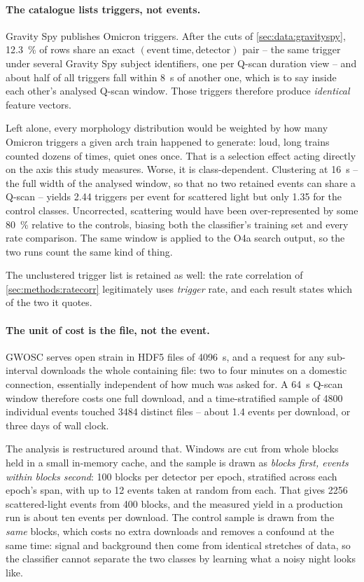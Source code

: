 \paragraph{The catalogue lists triggers, not events.} Gravity Spy publishes
Omicron triggers. After the cuts of \cref{sec:data:gravityspy},
\SI{12.3}{\percent} of rows share an exact $(\mathrm{event\ time},
\mathrm{detector})$ pair -- the same trigger under several Gravity Spy subject
identifiers, one per Q-scan duration view -- and about half of all triggers
fall within \SI{8}{\second} of another one, which is to say inside each other's
analysed Q-scan window. Those triggers therefore produce \emph{identical}
feature vectors.

Left alone, every morphology distribution would be weighted by how many
Omicron triggers a given arch train happened to generate: loud, long trains
counted dozens of times, quiet ones once. That is a selection effect acting
directly on the axis this study measures. Worse, it is class-dependent.
Clustering at \SI{16}{\second} -- the full width of the analysed window, so
that no two retained events can share a Q-scan -- yields \num{2.44} triggers
per event for scattered light but only \num{1.35} for the control classes.
Uncorrected, scattering would have been over-represented by some
\SI{80}{\percent} relative to the controls, biasing both the classifier's
training set and every rate comparison. The same window is applied to the O4a
search output, so the two runs count the same kind of thing.

The unclustered trigger list is retained as well: the rate correlation of
\cref{sec:methods:ratecorr} legitimately uses \emph{trigger} rate, and each
result states which of the two it quotes.

\paragraph{The unit of cost is the file, not the event.} GWOSC serves open
strain in HDF5 files of \SI{4096}{\second}, and a request for any
sub-interval downloads the whole containing file: two to four minutes on a
domestic connection, essentially independent of how much was asked for. A
\SI{64}{\second} Q-scan window therefore costs one full download, and a
time-stratified sample of \num{4800} individual events touched \num{3484}
distinct files -- about \num{1.4} events per download, or three days of wall
clock.

The analysis is restructured around that. Windows are cut from whole blocks
held in a small in-memory cache, and the sample is drawn as \emph{blocks
first, events within blocks second}: \num{100} blocks per detector per epoch,
stratified across each epoch's span, with up to \num{12} events taken at
random from each. That gives \num{2256} scattered-light events from \num{400}
blocks, and the measured yield in a production run is about ten events per
download. The control sample is drawn from the \emph{same} blocks, which costs
no extra downloads and removes a confound at the same time: signal and
background then come from identical stretches of data, so the classifier
cannot separate the two classes by learning what a noisy night looks like.

